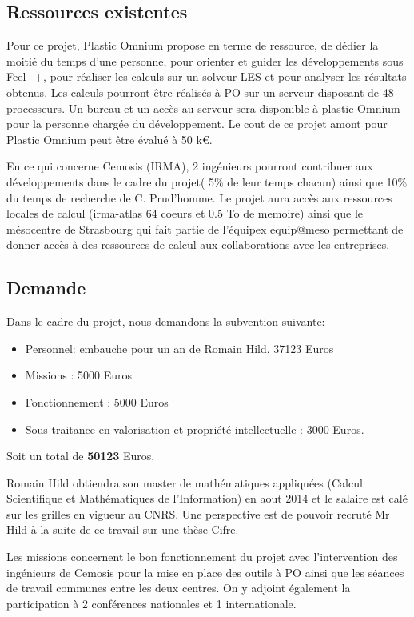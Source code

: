 \documentclass[12pt]{article}
\begin{document}
\subsection{Ressources existentes}

Pour ce projet, Plastic Omnium propose en terme de ressource, de dédier la
moitié du temps d’une personne, pour orienter et guider les développements sous
Feel++, pour réaliser les calculs sur un solveur LES et pour analyser les
résultats obtenus. Les calculs pourront être réalisés à PO sur un serveur
disposant de 48 processeurs. Un bureau et un accès au serveur sera disponible à
plastic Omnium pour la personne chargée du développement. Le cout de ce projet
amont pour Plastic Omnium peut être évalué à 50 k€.

En ce qui concerne Cemosis (IRMA), 2 ingénieurs pourront contribuer aux
développements dans le cadre du projet( 5\% de leur temps chacun) ainsi que 10\%
du temps de recherche de C. Prud'homme. Le projet aura accès aux ressources
locales de calcul (irma-atlas 64 coeurs et 0.5 To de memoire) ainsi que le
mésocentre de Strasbourg qui fait partie de l'équipex equip@meso permettant de
donner accès à des ressources de calcul aux collaborations avec les entreprises.

\subsection{Demande}


Dans le cadre du projet, nous demandons la subvention suivante:
\begin{itemize}
\item Personnel: embauche pour un an de Romain Hild, 37123 Euros
\item Missions : 5000 Euros
\item Fonctionnement  : 5000 Euros
\item Sous traitance en valorisation et propriété intellectuelle : 3000 Euros.
\end{itemize}
Soit un total de \textbf{50123} Euros.

Romain Hild obtiendra son master de mathématiques appliquées (Calcul
Scientifique et Mathématiques de l'Information) en aout 2014 et le salaire est
calé sur les grilles en vigueur au CNRS. Une perspective est de pouvoir recruté
Mr Hild à la suite de ce travail sur une thèse Cifre.

Les missions concernent le bon fonctionnement du projet avec l'intervention des
ingénieurs de Cemosis pour la mise en place des outils à PO ainsi que les
séances de travail communes entre les deux centres. On y adjoint également la
participation à 2 conférences nationales et 1 internationale.
\end{document}

